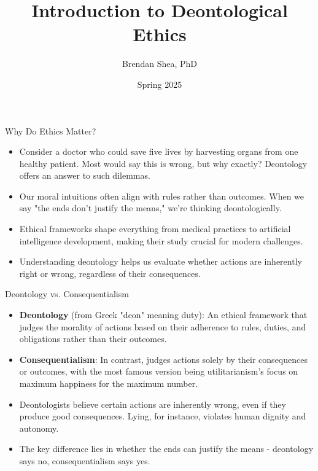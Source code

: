 \documentclass{beamer}
\title{Introduction to Deontological Ethics}
\author{Brendan Shea, PhD}
\date{Spring 2025}
\begin{document}
\begin{frame}
\titlepage
\end{frame}

\begin{frame}{Why Do Ethics Matter?}
\begin{itemize}
    \item Consider a doctor who could save five lives by harvesting organs from one healthy patient. Most would say this is wrong, but why exactly? Deontology offers an answer to such dilemmas.
    
    \item Our moral intuitions often align with rules rather than outcomes. When we say "the ends don't justify the means," we're thinking deontologically.
    
    \item Ethical frameworks shape everything from medical practices to artificial intelligence development, making their study crucial for modern challenges.
    
    \item Understanding deontology helps us evaluate whether actions are inherently right or wrong, regardless of their consequences.
\end{itemize}
\end{frame}

\begin{frame}{Deontology vs. Consequentialism}
\begin{itemize}
    \item \textbf{Deontology} (from Greek "deon" meaning duty): An ethical framework that judges the morality of actions based on their adherence to rules, duties, and obligations rather than their outcomes.
    
    \item \textbf{Consequentialism}: In contrast, judges actions solely by their consequences or outcomes, with the most famous version being utilitarianism's focus on maximum happiness for the maximum number.
    
    \item Deontologists believe certain actions are inherently wrong, even if they produce good consequences. Lying, for instance, violates human dignity and autonomy.
    
    \item The key difference lies in whether the ends can justify the means - deontology says no, consequentialism says yes.
\end{itemize}
\end{frame}
\end{document}
